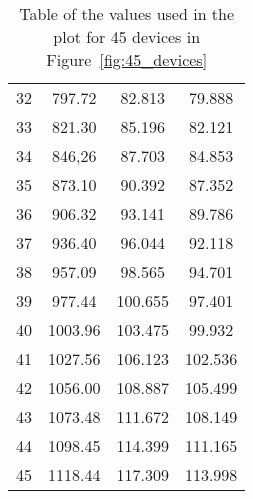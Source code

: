 \begin{table}[]
\begin{tabular}{c c c c}
    32 & 797.72 & 82.813 & 79.888  \\
    33 & 821.30 & 85.196 & 82.121  \\
    34 & 846,26 & 87.703 & 84.853  \\
    35 & 873.10 & 90.392 & 87.352  \\
    36 & 906.32 & 93.141 & 89.786  \\
    37 & 936.40 & 96.044 & 92.118  \\
    38 & 957.09 & 98.565 & 94.701  \\
    39 & 977.44 & 100.655 & 97.401  \\
    40 & 1003.96 & 103.475 & 99.932  \\
    41 & 1027.56 & 106.123 & 102.536  \\
    42 & 1056.00 & 108.887 & 105.499  \\
    43 & 1073.48 & 111.672 & 108.149  \\
    44 & 1098.45 & 114.399 & 111.165  \\
    45 & 1118.44 & 117.309 & 113.998  \\
    \end{tabular}
    \caption{Table of the values used in the plot for 45 devices in Figure~\ref{fig:45_devices}}
    \label{tab:45_devices}
\end{table}

\clearpage
